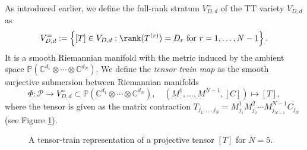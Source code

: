 \documentclass{article}
\theoremstyle{definition}
\newcommand{\C}{\mathbb{C}}
\renewcommand{\P}{\mathbb{P}}
\begin{document}
\noindent As introduced earlier, we define the full-rank stratum $V^{=}_{D,d}$ of the TT variety $V_{D,d}$ as
\[
V^{=}_{D,d}
:=
\left\{
[T]\in
V_{D,d}
:
\rank(T^{(r)})=D_r
\text{ for } r=1,\dots,N-1
\right\}.
\]
It is a smooth Riemannian manifold with the metric induced by the ambient space $\P(\C^{d_1} \otimes \cdots \otimes \C^{d_N})$. We define the \emph{tensor train map} as the smooth surjective submersion between Riemannian manifolds
\[
\Phi:\mathcal P\longrightarrow
V^{=}_{D,d} \subset\P\!\left(
\C^{d_1}\otimes\cdots\otimes \C^{d_N}
\right), \quad
(M^1,\dots,M^{N-1},[C])\longmapsto [T], 
\]
where the tensor is given as the matrix contraction $T_{j_1,\dots,j_N}
=
M^1_{j_1}M^2_{j_2}\cdots M^{N-1}_{j_{N-1}}C_{j_N}$ (see Figure 
\ref{fig:TT_decomp}). 
\begin{figure}[]
\centering
{}

\caption{A tensor-train representation of a projective tensor $[T]$ for $N=5$.}
\label{fig:TT_decomp}
\end{figure}
\end{document}
